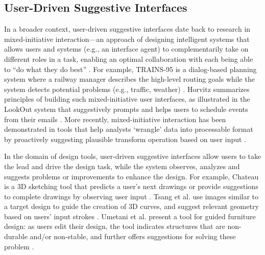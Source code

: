 \subsection{User-Driven Suggestive Interfaces}
In a broader context, user-driven suggestive interfaces date back to research in mixed-initiative interaction---an approach of designing intelligent systems that allows users and systems (e.g., an interface agent) to complementarily take on different roles in a task, enabling an optimal collaboration with each being able to ``do what they do best'' \cite{ferguson1996trains}. For example, TRAINS-95 is a dialog-based planning system where a railway manager describes the high-level routing goals while the system detects potential problems (e.g., traffic, weather) \cite{ferguson1996trains}. Horvitz summarizes principles of building such mixed-initiative user interfaces, as illustrated in the LookOut system that suggestively prompts and helps users to schedule events from their emails \cite{horvitz1999principles}. More recently, mixed-initiative interaction has been demonstrated in tools that help analysts `wrangle' data into processable format by proactively suggesting plausible transform operation based on user input \cite{umetani2012guided}.

In the domain of design tools, user-driven suggestive interfaces allow users to take the lead and drive the design task, while the system observes, analyzes and suggests problems or improvements to enhance the design. For example, Chateau is a 3D sketching tool that predicts a user's next drawings or provide suggestions to complete drawings by observing user input \cite{igarashi2001suggestive}. Tsang et al. use images similar to a target design to guide the creation of 3D curves, and suggest relevant geometry based on users' input strokes \cite{tsang2004suggestive}. Umetani et al. present a tool for guided furniture design: as users edit their design, the tool indicates structures that are non-durable and/or non-stable, and further offers suggestions for solving these problem \cite{umetani2012guided}. 


